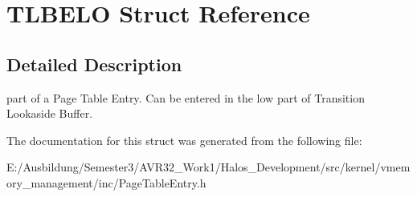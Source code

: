 \hypertarget{struct_t_l_b_e_l_o}{
\section{TLBELO Struct Reference}
\label{struct_t_l_b_e_l_o}
}


\subsection{Detailed Description}
part of a Page Table Entry. Can be entered in the low part of Transition Lookaside Buffer. 

The documentation for this struct was generated from the following file:\begin{CompactItemize}
\item 
E:/Ausbildung/Semester3/AVR32\_\-Work1/Halos\_\-Development/src/kernel/vmemory\_\-management/inc/PageTableEntry.h\end{CompactItemize}
